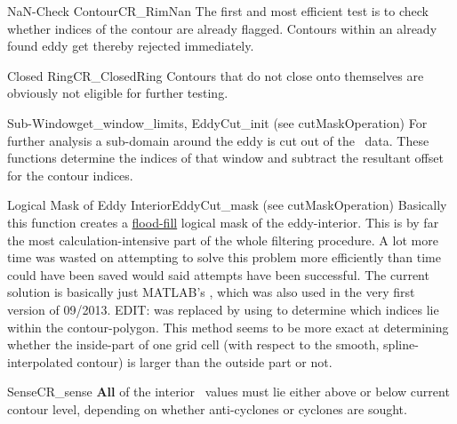\begin{filter}{NaN-Check Contour}{CR_RimNan}
The first and most efficient test is to check whether indices of the
contour are already flagged. Contours within an already found eddy get thereby
rejected immediately.
\end{filter}\newline
\begin{filter}{Closed Ring}{CR_ClosedRing}
Contours that do not close onto themselves are obviously not eligible for
further testing.
\end{filter}\newline
\begin{filter}{Sub-Window}{get_window_limits, EddyCut_init (see cutMaskOperation)}
For further analysis a sub-domain around the eddy is cut out of the \SSH~data.
These functions determine the indices of that window and subtract the
resultant offset for the contour indices.
\end{filter}\newline
\begin{filter}{Logical Mask of Eddy Interior}{EddyCut_mask (see cutMaskOperation)}
\label{filter:cutmask}
Basically this function creates a \href{http://en.wikipedia.org/wiki/Flood_fill}{flood-fill} logical mask of the
eddy-interior. This is by far the most calculation-intensive part of the whole
filtering procedure. A lot more time was wasted on attempting to solve this
problem more efficiently than time could have been saved would said attempts
have
been successful. The current solution is basically just MATLAB's , which was also used in the very first version of 09/2013.
EDIT:  was replaced by using  to determine which indices lie within the contour-polygon. This method seems to be more exact at determining whether the inside-part of one grid cell (with respect to the smooth, spline-interpolated contour) is larger than the outside part or not.
\end{filter}\newline
\begin{filter}{Sense}{CR_sense}
\textbf{All} of the interior \SSH~values must lie either above or below current
contour level, depending on whether anti-cyclones or cyclones are sought.
\end{filter}\newline
